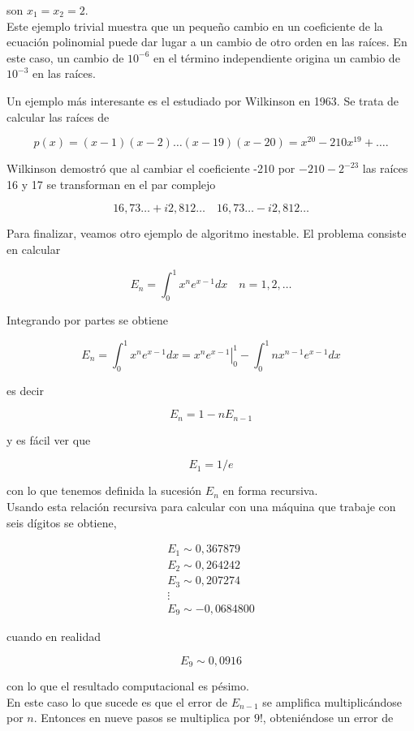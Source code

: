 \documentclass[10pt]{book}
\begin{document}
son $x_{1}=x_{2}=2$.\\
Este ejemplo trivial muestra que un pequeño cambio en un coeficiente de la ecuación polinomial puede dar lugar a un cambio de otro orden en las raíces. En este caso, un cambio de $10^{-6}$ en el término independiente origina un cambio de $10^{-3}$ en las raíces.

Un ejemplo más interesante es el estudiado por Wilkinson en 1963. Se trata de calcular las raíces de

$$
p(x)=(x-1)(x-2) \ldots(x-19)(x-20)=x^{20}-210 x^{19}+\ldots .
$$

Wilkinson demostró que al cambiar el coeficiente -210 por $-210-2^{-23}$ las raíces 16 y 17 se transforman en el par complejo

$$
16,73 \ldots+i 2,812 \ldots \quad 16,73 \ldots-i 2,812 \ldots
$$

Para finalizar, veamos otro ejemplo de algoritmo inestable. El problema consiste en calcular

$$
E_{n}=\int_{0}^{1} x^{n} e^{x-1} d x \quad n=1,2, \ldots
$$

Integrando por partes se obtiene

$$
E_{n}=\int_{0}^{1} x^{n} e^{x-1} d x=\left.x^{n} e^{x-1}\right|_{0} ^{1}-\int_{0}^{1} n x^{n-1} e^{x-1} d x
$$

es decir

$$
E_{n}=1-n E_{n-1}
$$

y es fácil ver que

$$
E_{1}=1 / e
$$

con lo que tenemos definida la sucesión $E_{n}$ en forma recursiva.\\
Usando esta relación recursiva para calcular con una máquina que trabaje con seis dígitos se obtiene,

$$
\begin{gathered}
E_{1} \sim 0,367879 \\
E_{2} \sim 0,264242 \\
E_{3} \sim 0,207274 \\
\vdots \\
E_{9} \sim-0,0684800
\end{gathered}
$$

cuando en realidad

$$
E_{9} \sim 0,0916
$$

con lo que el resultado computacional es pésimo.\\
En este caso lo que sucede es que el error de $E_{n-1}$ se amplifica multiplicándose por $n$. Entonces en nueve pasos se multiplica por $9!$, obteniéndose un error de
\end{document}
